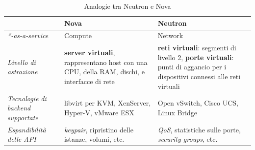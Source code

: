 \begin{table}[h]
\centering
\begin{tabular}{| m{3cm}| m{5cm} | m{5cm} | }
\hline
& \textbf{Nova} & \textbf{Neutron} \\ \hline
\textit{*-as-a-service} & Compute & Network \\ \hline
\textit{Livello di astrazione} & \textbf{server virtuali}, rappresentano host con una CPU, della RAM, dischi, e interfacce di rete & \textbf{reti virtuali}: segmenti di livello 2, \textbf{porte virtuali}: punti di aggancio per i dispositivi connessi alle reti virtuali \\ \hline
\textit{Tecnologie di backend supportate} & libvirt per KVM, XenServer, Hyper-V, vMware ESX & Open vSwitch, Cisco UCS, Linux Bridge \\ \hline
\textit{Espandibilità delle API} & \textit{keypair}, ripristino delle istanze, volumi, etc. & \textit{QoS}, statistiche sulle porte, \textit{security groups}, etc. \\ \hline

\end{tabular}
\caption{Analogie tra Neutron e Nova}
\label{tab:AnalogiesNeutronNova}
\end{table}
\begin{figure}[H]
\centering
{}
\caption{\cite{NeutronNova}}\label{NeutronNova}
\end{figure}

